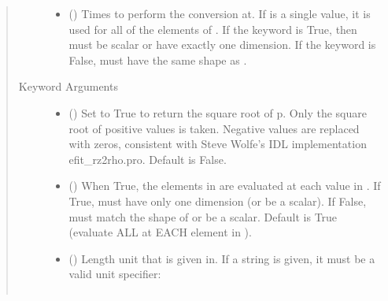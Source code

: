 \documentclass[letterpaper,10pt,english]{sphinxmanual}
\begin{document}
\begin{fulllineitems}
\begin{fulllineitems}
\begin{quote}
\begin{description}
\begin{itemize}
\item {} 
 () \textendash{} Times to perform the conversion at.
If  is a single value, it is used for all of the elements of
. If the  keyword is True, then  must be scalar
or have exactly one dimension. If the  keyword is False,
 must have the same shape as .

\end{itemize}

\item[{Keyword Arguments}] \leavevmode\begin{itemize}
\item {} 
 () \textendash{} Set to True to return the square root of p.
Only the square root of positive values is taken. Negative
values are replaced with zeros, consistent with Steve Wolfe’s
IDL implementation efit\_rz2rho.pro. Default is False.

\item {} 
 () \textendash{} When True, the elements in  are evaluated
at each value in . If True,  must have only one dimension
(or be a scalar). If False,  must match the shape of 
or be a scalar. Default is True (evaluate ALL  at EACH
element in ).

\item {} 
 () \textendash{} 
Length unit that  is given in.
If a string is given, it must be a valid unit specifier:
\begin{quote}


\begin{savenotes}\sphinxattablestart
\centering
\begin{tabulary}{\linewidth}[t]{|T|T|}
\hline


\end{tabulary}
\end{savenotes}
\end{quote}
\end{itemize}
\end{description}
\end{quote}
\end{fulllineitems}
\end{fulllineitems}
\end{document}
